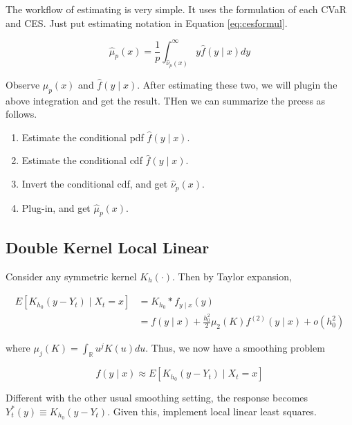 \documentclass[
]{article}
\providecommand{\tightlist}{%
  \setlength{\itemsep}{0pt}\setlength{\parskip}{0pt}}
\theoremstyle{definition}
\theoremstyle{definition}
\theoremstyle{definition}
\theoremstyle{remark}
\begin{document}
The workflow of estimating is very simple. It uses the formulation of each CVaR and CES. Just put estimating notation in Equation \eqref{eq:cesformul}.

\begin{equation}
  \hat\mu_p(x) = \frac{1}{p} \int_{\hat\nu_p(x)}^\infty y \hat{f}(y \mid x) dy
  \label{eq:ceshat}
\end{equation}

Observe \(\hat\mu_p(x)\) and \(\hat{f}(y \mid x)\). After estimating these two, we will plugin the above integration and get the result. THen we can summarize the prcess as follows.

\begin{enumerate}
\def\labelenumi{\arabic{enumi}.}
\tightlist
\item
  Estimate the conditional pdf \(\hat{f}(y \mid x)\).
\item
  Estimate the conditional cdf \(\hat{f}(y \mid x)\).
\item
  Invert the conditional cdf, and get \(\hat\nu_p(x)\).
\item
  Plug-in, and get \(\hat\mu_p(x)\).
\end{enumerate}

\hypertarget{double-kernel-local-linear}{%
\subsection{Double Kernel Local Linear}\label{double-kernel-local-linear}}

Consider any symmetric kernel \(K_h(\cdot)\). Then by Taylor expansion,

\begin{equation}
  \begin{split}
    E [ K_{h_0}(y - Y_t) \mid X_t = x ] & = K_{h_0} \ast f_{y \mid x} (y) \\
    & = f(y \mid x) + \frac{h_0^2}{2} \mu_2(K) f^{(2)}(y \mid x) + o(h_0^2)
  \end{split}
  \label{eq:convolution}
\end{equation}

where \(\mu_j(K) = \int_{\mathbb{R}}u^j K(u) du\). Thus, we now have a smoothing problem

\begin{equation}
  f(y \mid x) \approx E \left[ K_{h_0}(y - Y_t) \mid X_t = x \right]
  \label{eq:smoothing}
\end{equation}

Different with the other usual smoothing setting, the response becomes \(Y_t^{\ast}(y) \equiv K_{h_0}(y - Y_t)\). Given this, implement local linear least squares.
\end{document}
